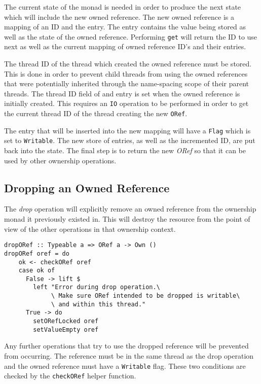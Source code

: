 \documentclass[onehalf,11pt]{beavtex}
\begin{document}
The current state of the monad is needed in order to produce the next state
which will include the new owned reference.
The new owned reference is a mapping of an ID and the entry. The entry
contains the value being stored as well as the state of the owned reference.
Performing \texttt{get} will return the ID to use next as well as the current
mapping of owned reference ID's and their entries.

The thread ID of the thread which created the owned reference must
be stored.  This is done in order to prevent child threads from using the owned
references that were potentially inherited through the name-spacing scope of
their parent threads.  The thread ID field of and entry is set when the owned
reference is initially created. This requires an \texttt{IO} operation to be
performed in order to get the current thread ID of the thread creating the
new \texttt{ORef}.

The entry that will be inserted into the new mapping will have a \texttt{Flag}
which is set to \texttt{Writable}.
The new store of entries, as well as the incremented ID, are put back into the
state.
The final step is to return the new \textit{ORef} so that it can be used by other
ownership operations.

\subsection{Dropping an Owned Reference}

The \textit{drop} operation will explicitly remove an owned reference from the
ownership monad it previously existed in.
This will destroy the resource from the point of view of the other operations
in that ownership context.

\begin{verbatim}
dropORef :: Typeable a => ORef a -> Own ()
dropORef oref = do
    ok <- checkORef oref
    case ok of
      False -> lift $
        left "Error during drop operation.\
             \ Make sure ORef intended to be dropped is writable\
             \ and within this thread."
      True -> do
        setORefLocked oref
        setValueEmpty oref
\end{verbatim}

Any further operations that try to use the dropped reference will be prevented
from occurring.
The reference must be in the same thread as the drop operation and the owned
reference must have a \texttt{Writable} flag. These two conditions are checked
by the \texttt{checkORef} helper function.
\end{document}
